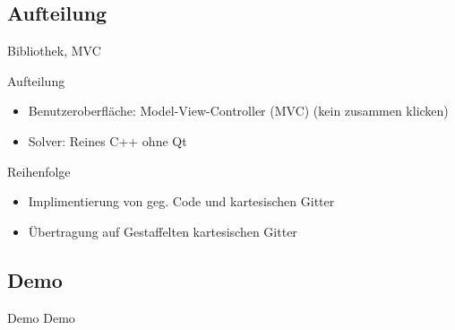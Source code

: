 \documentclass{beamer}
\begin{document}
  \subsection{Aufteilung}
    \begin{frame}{Bibliothek, MVC}
    
  \begin{block}{Aufteilung}
    \begin{itemize}
      \item Benutzeroberfl\"ache: Model-View-Controller (MVC) (kein zusammen klicken)
      \item Solver: Reines C++ ohne Qt
    \end{itemize}
    \end{block}
    \begin{block}{Reihenfolge}
     \begin{itemize}
      \item Implimentierung von geg. Code und kartesischen Gitter
      \item \"Ubertragung auf Gestaffelten kartesischen Gitter
    \end{itemize}
    \end{block}
    
    \end{frame}
    \subsection{Demo}
    \begin{frame}{Demo}
      \center \Huge{Demo}
    \end{frame}
\end{document}
